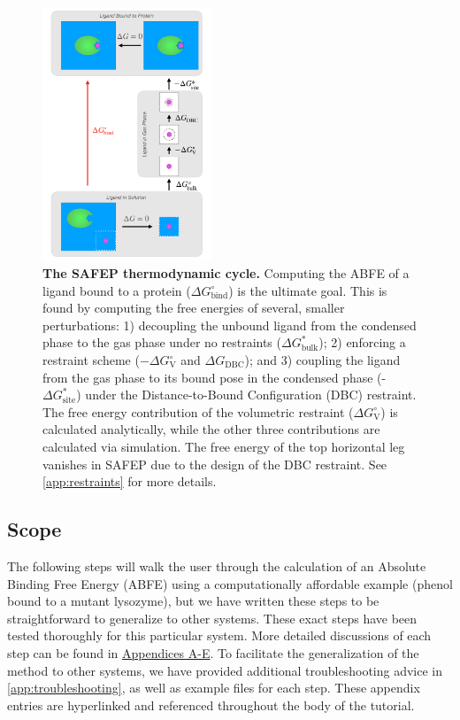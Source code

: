 \documentclass[9pt,tutorial,pubversion]{Styling/livecoms}
\begin{document}
\begin{figure}[!ht]
    \centering
    \includegraphics[width=0.45\textwidth]{SAFEP_cycle.pdf}
    \caption{\textbf{The SAFEP thermodynamic cycle.} 
    Computing the ABFE of a ligand bound to a protein ($\Delta G^\circ_\mathrm{bind}$) is the ultimate goal. 
    This is found by computing the free energies of several, smaller perturbations: 1) decoupling the unbound ligand from the condensed phase to the gas phase under no restraints ($\Delta G^*_{\mathrm{bulk}}$); 2) enforcing a restraint scheme ($-\Delta G^\circ_\mathrm{V}$ and $\Delta G_\mathrm{DBC}$); and 3) coupling the ligand from the gas phase to its bound pose in the condensed phase (-$\Delta G^*_{\mathrm{site}}$) under the Distance-to-Bound Configuration (DBC) restraint.
    The free energy contribution of the volumetric restraint ($\Delta G^\circ_\mathrm{V}$) is calculated analytically, while the other three contributions are calculated via simulation. The free energy of the top horizontal leg vanishes in SAFEP due to the design of the DBC restraint. See \ref{app:restraints} for more details.}
    \label{fig:cycle}
\end{figure}

\subsection{Scope}
The following steps will walk the user through the calculation of an Absolute Binding Free Energy (ABFE) using a computationally affordable example (phenol bound to a mutant lysozyme), but we have written these steps to be straightforward to generalize to other systems.
These exact steps have been tested thoroughly for this particular system.
More detailed discussions of each step can be found in \hyperref[app:motivation]{Appendices A-E}. To facilitate the generalization of the method to other systems, we have provided additional troubleshooting advice in \ref{app:troubleshooting}, as well as example files for each step.
These appendix entries are hyperlinked and referenced throughout the body of the tutorial.
\end{document}
